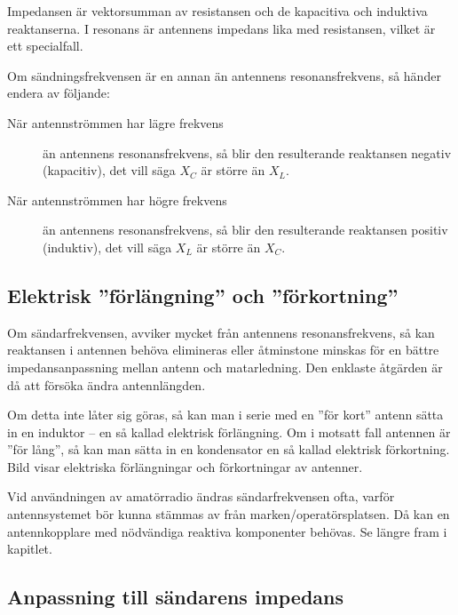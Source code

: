 Impedansen är vektorsumman av resistansen och de kapacitiva och
induktiva reaktanserna.
I resonans är antennens impedans lika med resistansen, vilket är ett
specialfall.

Om sändningsfrekvensen är en annan än antennens resonansfrekvens, så händer
endera av följande:

\begin{description}
\item[När antennströmmen har lägre frekvens] än antennens resonansfrekvens, så blir
den resulterande reaktansen negativ (kapacitiv), det vill säga \(X_C\) är större
än \(X_L\).

\item[När antennströmmen har högre frekvens] än antennens resonansfrekvens,
så blir den resulterande reaktansen positiv (induktiv), det vill säga \(X_L\)
är större än \(X_C\).
\end{description}


\subsection{Elektrisk ''förlängning'' och ''förkortning''}
\label{elektrisk förlängning}

Om sändarfrekvensen, avviker mycket från antennens resonansfrekvens,
så kan reaktansen i antennen behöva elimineras eller åtminstone
minskas för en bättre impedansanpassning mellan antenn och matarledning.
Den enklaste åtgärden är då att försöka ändra antennlängden.

Om detta inte låter sig göras, så kan man i serie med en ''för kort''
antenn sätta in en induktor -- en så kallad elektrisk förlängning.
Om i motsatt fall antennen är ''för lång'', så kan man sätta in en
kondensator en så kallad elektrisk förkortning.
Bild  visar elektriska förlängningar och förkortningar av
antenner.

Vid användningen av amatörradio ändras sändarfrekvensen ofta, varför
antennsystemet bör kunna stämmas av från marken/operatörsplatsen.
Då kan en antennkopplare med nödvändiga reaktiva komponenter behövas.
Se längre fram i kapitlet.

\subsection{Anpassning till sändarens impedans}
\label{antenner_ståendevåg}

